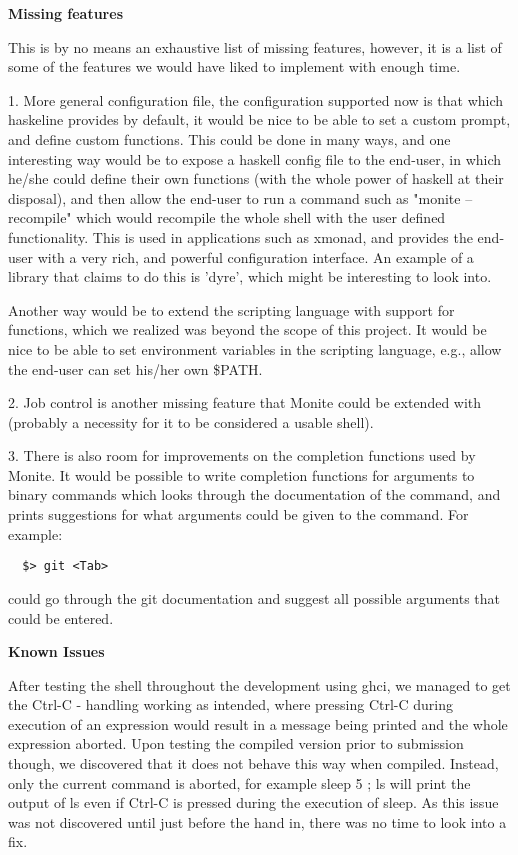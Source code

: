 \documentclass[11pt,a4paper]{article}
\begin{document}
\textbf{Missing features}

This is by no means an exhaustive list of missing features, however, it is a
list of some of the features we would have liked to implement with enough time.

1. More general configuration file, the configuration supported now is that
which haskeline provides by default, it would be nice to be able to set a custom
prompt, and define custom functions. This could be done in many ways, and one
interesting way would be to expose a haskell config file to the end-user, in
which he/she could define their own functions (with the whole power of haskell
at their disposal), and then allow the end-user to run a command such as "monite
--recompile" which would recompile the whole shell with the user defined
functionality. This is used in applications such as xmonad, and provides the
end-user with a very rich, and powerful configuration interface. An example of a
library that claims to do this is 'dyre', which might be interesting to look
into.

Another way would be to extend the scripting language with support for
functions, which we realized was beyond the scope of this project. It would be
nice to be able to set environment variables in the scripting language, e.g.,
allow the end-user can set his/her own \$PATH.

2. Job control is another missing feature that Monite could be extended with
(probably a necessity for it to be considered a usable shell).

3. There is also room for improvements on the completion functions used by
Monite.  It would be possible to write completion functions for arguments to
binary commands which looks through the documentation of the command, and prints
suggestions for what arguments could be given to the command. For example:

\begin{verbatim}
  $> git <Tab>
\end{verbatim}

could go through the git documentation and suggest all possible arguments that
could be entered.

\textbf{Known Issues}

After testing the shell throughout the development using ghci, we managed to
get the Ctrl-C - handling working as intended, where pressing Ctrl-C during
execution of an expression would result in a message being printed and the
whole expression aborted. Upon testing the compiled version prior to submission
though, we discovered that it does not behave this way when compiled. Instead,
only the current command is aborted, for example sleep 5 ; ls will print the
output of ls even if Ctrl-C is pressed during the execution of sleep. As this
issue was not discovered until just before the hand in, there was no time to
look into a fix.
\end{document}
